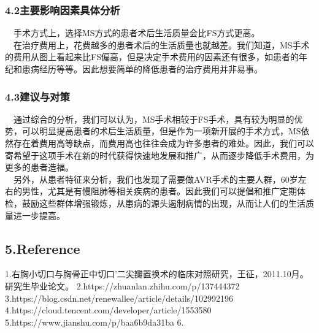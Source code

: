 \documentclass[
]{article}
\begin{document}
\hypertarget{ux4e3bux8981ux5f71ux54cdux56e0ux7d20ux5177ux4f53ux5206ux6790}{%
\subsubsection{4.2主要影响因素具体分析}\label{ux4e3bux8981ux5f71ux54cdux56e0ux7d20ux5177ux4f53ux5206ux6790}}

 手术方式上，选择MS方式的患者术后生活质量会比FS方式更高。\\
 在治疗费用上，花费越多的患者术后的生活质量也就越差。我们知道，MS手术的费用从图上看起来比FS偏高，但是决定手术费用的因素还有很多，如患者的年纪和患病经历等等。因此想要简单的降低患者的治疗费用并非易事。

\hypertarget{ux5efaux8baeux4e0eux5bf9ux7b56}{%
\subsubsection{4.3建议与对策}\label{ux5efaux8baeux4e0eux5bf9ux7b56}}

 通过综合的分析，我们可以认为，MS手术相较于FS手术，具有较为明显的优势，可以明显提高患者的术后生活质量，但是作为一项新开展的手术方式，MS依然存在着费用高等缺点，而费用高也往往会成为许多患者的难处。因此，我们可以寄希望于这项手术在新的时代获得快速地发展和推广，从而逐步降低手术费用，为更多的患者造福。\\
 另外，从患者特征来分析，我们也发现了需要做AVR手术的主要人群，60岁左右的男性，尤其是有慢阻肺等相关疾病的患者。因此我们可以提倡和推广定期体检，鼓励这些群体增强锻炼，从患病的源头遏制病情的出现，从而让人们的生活质量进一步提高。

\hypertarget{reference}{%
\subsection{5.Reference}\label{reference}}

1.右胸小切口与胸骨正中切口'二尖瓣置换术的临床对照研究，王征，2011.10月。研究生毕业论文。
2.https://zhuanlan.zhihu.com/p/137444372
3.https://blog.csdn.net/renewallee/article/details/102992196
4.https://cloud.tencent.com/developer/article/1553580
5.https://www.jianshu.com/p/baa6b9da31ba 6.
\end{document}
